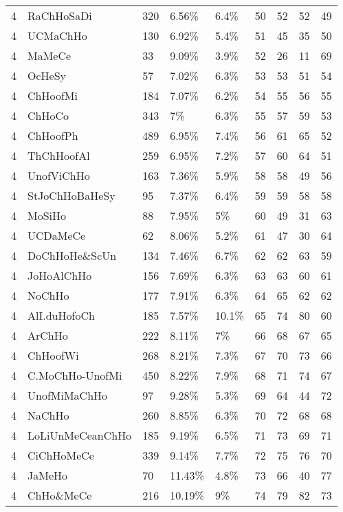 \begin{longtable}{lllllrrrr}
  4 & RaChHoSaDi & 320 & 6.56\% & 6.4\% &  50 &  52 &  52 &  49 \\ 
  4 & UCMaChHo & 130 & 6.92\% & 5.4\% &  51 &  45 &  35 &  50 \\ 
  4 & MaMeCe & 33 & 9.09\% & 3.9\% &  52 &  26 &  11 &  69 \\ 
  4 & OcHeSy & 57 & 7.02\% & 6.3\% &  53 &  53 &  51 &  54 \\ 
  4 & ChHoofMi & 184 & 7.07\% & 6.2\% &  54 &  55 &  56 &  55 \\ 
  4 & ChHoCo & 343 & 7\% & 6.3\% &  55 &  57 &  59 &  53 \\ 
  4 & ChHoofPh & 489 & 6.95\% & 7.4\% &  56 &  61 &  65 &  52 \\ 
  4 & ThChHoofAl & 259 & 6.95\% & 7.2\% &  57 &  60 &  64 &  51 \\ 
  4 & UnofViChHo & 163 & 7.36\% & 5.9\% &  58 &  58 &  49 &  56 \\ 
  4 & StJoChHoBaHeSy & 95 & 7.37\% & 6.4\% &  59 &  59 &  58 &  58 \\ 
  4 & MoSiHo & 88 & 7.95\% & 5\% &  60 &  49 &  31 &  63 \\ 
  4 & UCDaMeCe & 62 & 8.06\% & 5.2\% &  61 &  47 &  30 &  64 \\ 
  4 & DoChHoHe\&ScUn & 134 & 7.46\% & 6.7\% &  62 &  62 &  63 &  59 \\ 
  4 & JoHoAlChHo & 156 & 7.69\% & 6.3\% &  63 &  63 &  60 &  61 \\ 
  4 & NoChHo & 177 & 7.91\% & 6.3\% &  64 &  65 &  62 &  62 \\ 
  4 & AlI.duHofoCh & 185 & 7.57\% & 10.1\% &  65 &  74 &  80 &  60 \\ 
  4 & ArChHo & 222 & 8.11\% & 7\% &  66 &  68 &  67 &  65 \\ 
  4 & ChHoofWi & 268 & 8.21\% & 7.3\% &  67 &  70 &  73 &  66 \\ 
  4 & C.MoChHo-UnofMi & 450 & 8.22\% & 7.9\% &  68 &  71 &  74 &  67 \\ 
  4 & UnofMiMaChHo & 97 & 9.28\% & 5.3\% &  69 &  64 &  44 &  72 \\ 
  4 & NaChHo & 260 & 8.85\% & 6.3\% &  70 &  72 &  68 &  68 \\ 
  4 & LoLiUnMeCeanChHo & 185 & 9.19\% & 6.5\% &  71 &  73 &  69 &  71 \\ 
  4 & CiChHoMeCe & 339 & 9.14\% & 7.7\% &  72 &  75 &  76 &  70 \\ 
  4 & JaMeHo & 70 & 11.43\% & 4.8\% &  73 &  66 &  40 &  77 \\ 
  4 & ChHo\&MeCe & 216 & 10.19\% & 9\% &  74 &  79 &  82 &  73 \\ 

\end{longtable}
